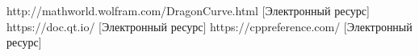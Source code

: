 \documentclass[12pt, a4paper]{report}
\begin{document}
	\newpage
	
	\begin{thebibliography}{}
	 http://mathworld.wolfram.com/DragonCurve.html [Электронный ресурс]
	 https://doc.qt.io/ [Электронный ресурс]
	 https://cppreference.com/ [Электронный ресурс]
	\end{thebibliography}
\end{document}
